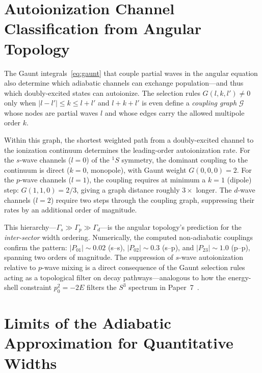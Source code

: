 \documentclass[aps,pra,twocolumn,superscriptaddress,longbibliography]{revtex4-2}
\begin{document}

\section{Autoionization Channel Classification from Angular Topology}
\label{sec:autoionization}

The Gaunt integrals~\eqref{eq:gaunt} that couple partial waves in the
angular equation also determine which adiabatic channels can exchange
population---and thus which doubly-excited states can autoionize.
The selection rules $G(l, k, l') \neq 0$ only when $|l - l'| \leq k
\leq l + l'$ and $l + k + l'$ is even define a \emph{coupling graph}
$\mathcal{G}$ whose nodes are partial waves $l$ and whose edges carry
the allowed multipole order $k$.

Within this graph, the shortest weighted path from a doubly-excited
channel to the ionization continuum determines the leading-order
autoionization rate.  For the $s$-wave channels ($l = 0$) of the
$^1S$ symmetry, the dominant coupling to the continuum is direct
($k = 0$, monopole), with Gaunt weight $G(0,0,0) = 2$.  For the
$p$-wave channels ($l = 1$), the coupling requires at minimum a
$k = 1$ (dipole) step: $G(1,1,0) = 2/3$, giving a graph distance
roughly $3\times$ longer.  The $d$-wave channels ($l = 2$) require
two steps through the coupling graph, suppressing their rates by
an additional order of magnitude.

This hierarchy---$\Gamma_s \gg \Gamma_p \gg \Gamma_d$---is the
angular topology's prediction for the \emph{inter-sector} width
ordering.  Numerically, the computed non-adiabatic couplings confirm
the pattern: $|P_{01}| \sim 0.02$ (s--s), $|P_{02}| \sim 0.3$
(s--p), and $|P_{23}| \sim 1.0$ (p--p), spanning two orders of
magnitude.  The suppression of $s$-wave autoionization relative to
$p$-wave mixing is a direct consequence of the Gaunt selection rules
acting as a topological filter on decay pathways---analogous to how
the energy-shell constraint $p_0^2 = -2E$ filters the $S^3$ spectrum
in Paper~7~\cite{loutey_paper7}.


\section{Limits of the Adiabatic Approximation for Quantitative Widths}
\label{sec:adiabatic_limits}
\end{document}
